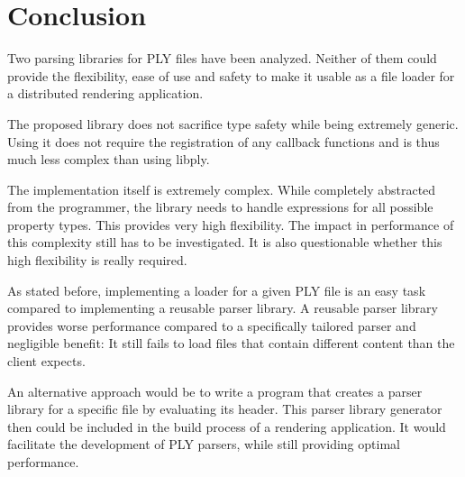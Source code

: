 \documentclass[a4paper,parskip=half,twocolumn]{scrartcl}
\begin{document}
\section{Conclusion}

Two parsing libraries for PLY files have been analyzed. Neither of them could
provide the flexibility, ease of use and safety to make it usable as a file
loader for a distributed rendering application.

The proposed library does not sacrifice type safety while being extremely
generic. Using it does not require the registration of any callback functions
and is thus much less complex  than using libply.

The implementation itself is extremely complex. While completely abstracted from
the programmer, the library needs to handle expressions for all possible
property types. This provides very high flexibility. The impact in performance
of this complexity still has to be investigated. It is also questionable whether
this high flexibility is really required.

As stated before, implementing a loader for a given PLY file is an easy task
compared to implementing a reusable parser library. A reusable parser library
provides worse performance compared to a specifically tailored parser and
negligible benefit: It still fails to load files that contain different content
than the client expects.

An alternative approach would be to write a program that creates a parser
library for a specific file by evaluating its header. This parser library
generator then could be included in the build process of a rendering
application. It would facilitate the development of PLY parsers, while still
providing optimal performance.

%
%
\end{document}
